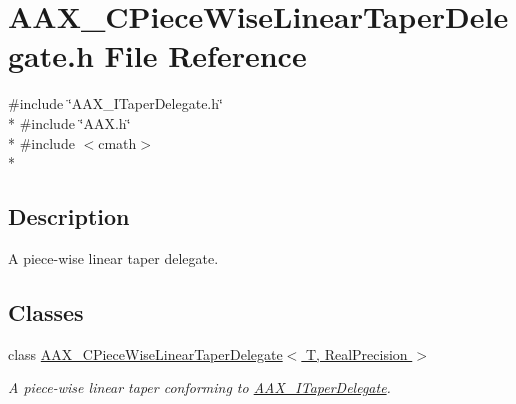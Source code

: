 \hypertarget{a00193}{}\section{A\+A\+X\+\_\+\+C\+Piece\+Wise\+Linear\+Taper\+Delegate.\+h File Reference}
\label{a00193}
{\ttfamily \#include \char`\"{}A\+A\+X\+\_\+\+I\+Taper\+Delegate.\+h\char`\"{}}\\*
{\ttfamily \#include \char`\"{}A\+A\+X.\+h\char`\"{}}\\*
{\ttfamily \#include $<$cmath$>$}\\*


\subsection{Description}
A piece-\/wise linear taper delegate. 

\subsection*{Classes}
\begin{DoxyCompactItemize}
\item 
class \hyperlink{a00037}{A\+A\+X\+\_\+\+C\+Piece\+Wise\+Linear\+Taper\+Delegate$<$ T, Real\+Precision $>$}
\begin{DoxyCompactList}\small\item\em A piece-\/wise linear taper conforming to \hyperlink{a00114}{A\+A\+X\+\_\+\+I\+Taper\+Delegate}. \end{DoxyCompactList}\end{DoxyCompactItemize}

